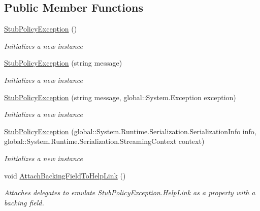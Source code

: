 \subsection*{Public Member Functions}
\begin{DoxyCompactItemize}
\item 
\hyperlink{class_system_1_1_security_1_1_policy_1_1_fakes_1_1_stub_policy_exception_a85ae570f1ada2ba19d491a5fd703ba1e}{Stub\-Policy\-Exception} ()
\begin{DoxyCompactList}\small\item\em Initializes a new instance\end{DoxyCompactList}\item 
\hyperlink{class_system_1_1_security_1_1_policy_1_1_fakes_1_1_stub_policy_exception_a31c92e7e567d2dfafff2803de86d67df}{Stub\-Policy\-Exception} (string message)
\begin{DoxyCompactList}\small\item\em Initializes a new instance\end{DoxyCompactList}\item 
\hyperlink{class_system_1_1_security_1_1_policy_1_1_fakes_1_1_stub_policy_exception_ac0c8fe00ab19f035af43e0264129264f}{Stub\-Policy\-Exception} (string message, global\-::\-System.\-Exception exception)
\begin{DoxyCompactList}\small\item\em Initializes a new instance\end{DoxyCompactList}\item 
\hyperlink{class_system_1_1_security_1_1_policy_1_1_fakes_1_1_stub_policy_exception_a86f79a5bc2a059765b758bc1f84c1c91}{Stub\-Policy\-Exception} (global\-::\-System.\-Runtime.\-Serialization.\-Serialization\-Info info, global\-::\-System.\-Runtime.\-Serialization.\-Streaming\-Context context)
\begin{DoxyCompactList}\small\item\em Initializes a new instance\end{DoxyCompactList}\item 
void \hyperlink{class_system_1_1_security_1_1_policy_1_1_fakes_1_1_stub_policy_exception_a7bcee68cb43835beb784dba8faa053ff}{Attach\-Backing\-Field\-To\-Help\-Link} ()
\begin{DoxyCompactList}\small\item\em Attaches delegates to emulate \hyperlink{class_system_1_1_security_1_1_policy_1_1_fakes_1_1_stub_policy_exception_a3f5b9fed7dc12fb3c78593a24c88b2b3}{Stub\-Policy\-Exception.\-Help\-Link} as a property with a backing field.\end{DoxyCompactList}\item 

\end{DoxyCompactItemize}
